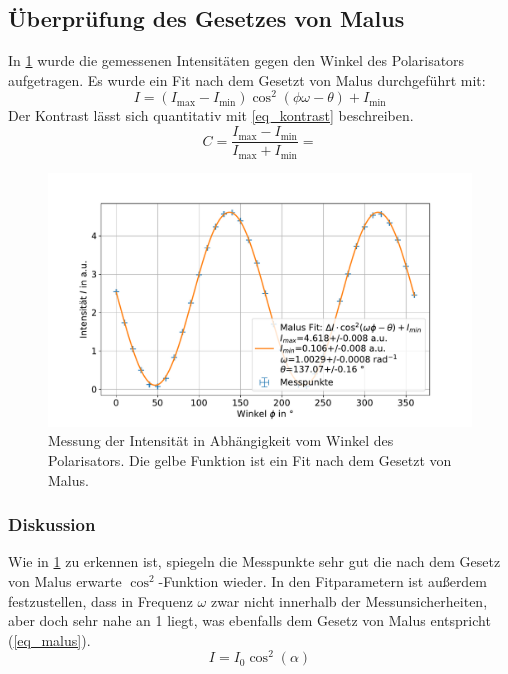 \documentclass[
	a4paper,
	12pt,
	pagesize,
	ngerman
]{scrartcl}
\begin{document}
		\subsection{Überprüfung des Gesetzes von Malus}\label{ss_malus}
		In \cref{fig_malus} wurde die gemessenen Intensitäten gegen den Winkel des Polarisators aufgetragen.
		Es wurde ein Fit nach dem Gesetzt von Malus durchgeführt mit:
		\begin{equation}
			\label{eq_malus}
			I = (I_\text{max}-I_\text{min})\cos^2(\phi\omega-\theta) +I_\text{min}
		\end{equation}
		Der Kontrast lässt sich quantitativ mit \cref{eq_kontrast} beschreiben.
		\begin{equation}
			\label{eq_kontrast}
			C = \frac{I_\text{max}-I_\text{min}}{I_\text{max}+I_\text{min}}= 
		\end{equation}

	\begin{figure}[H]
			\includegraphics[width=0.8\linewidth]{img/malus}
			\caption{
			Messung der Intensität in Abhängigkeit vom Winkel des Polarisators.
			Die gelbe Funktion ist ein Fit nach dem Gesetzt von Malus.
			}
			\label{fig_malus}
	\end{figure}




			\subsubsection*{Diskussion}

			Wie in \cref{fig_malus} zu erkennen ist, spiegeln die Messpunkte sehr gut die nach dem Gesetz von Malus erwarte $\cos ^2$-Funktion wieder.
			In den Fitparametern ist außerdem festzustellen, dass in Frequenz $\omega$ zwar nicht innerhalb der Messunsicherheiten, aber doch sehr nahe an \num{1} liegt, was ebenfalls dem Gesetz von Malus entspricht (\cref{eq_malus}).
			\begin{equation}
				I = I_0 \cos^2(\alpha)
			\end{equation}
\end{document}
